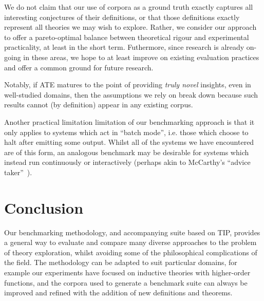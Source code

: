 We do not claim that our use of corpora as a ground truth exactly captures all
interesting conjectures of their definitions, or that those definitions exactly
represent all theories we may wish to explore. Rather, we consider our approach
to offer a pareto-optimal balance between theoretical rigour and experimental
practicality, at least in the short term. Futhermore, since research is already
on-going in these areas, we hope to at least improve on existing evaluation
practices and offer a common ground for future research.

Notably, if ATE matures to the point of providing \emph{truly novel} insights,
even in well-studied domains, then the assumptions we rely on break down because
such results cannot (by definition) appear in any existing corpus.

Another practical limitation limitation of our benchmarking approach is that it
only applies to systems which act in ``batch mode'', i.e. those which choose to
halt after emitting some output. Whilst all of the systems we have encountered
are of this form, an analogous benchmark may be desirable for systems which
instead run continuously or interactively (perhaps akin to McCarthy's
``advice taker''~\cite{McCarthy_Programs59}).






\section{Conclusion}
\label{sec:conclusion}


Our benchmarking methodology, and accompanying suite based on TIP, provides a
general way to evaluate and compare many diverse approaches to the problem of
theory exploration, whilst avoiding some of the philosophical complications of
the field. The methodology can be adapted to suit particular domains, for
example our experiments have focused on inductive theories with higher-order
functions, and the corpora used to generate a benchmark suite can always be
improved and refined with the addition of new definitions and theorems.

